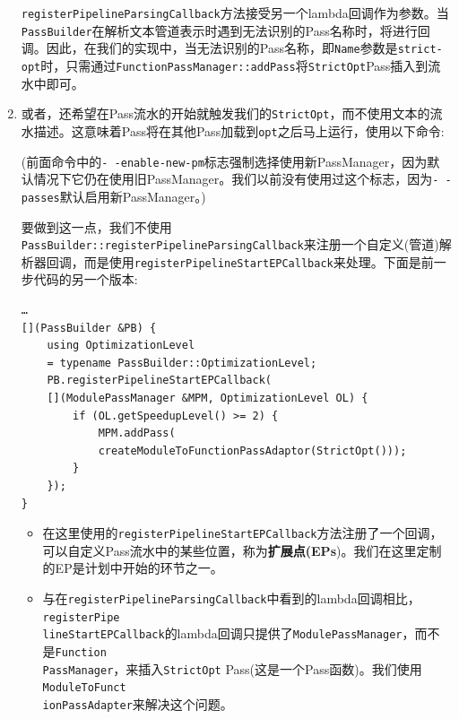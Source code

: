 \begin{enumerate}
\texttt{registerPipelineParsingCallback}方法接受另一个lambda回调作为参数。当\texttt{PassBuilder}在解析文本管道表示时遇到无法识别的Pass名称时，将进行回调。因此，在我们的实现中，当无法识别的Pass名称，即\texttt{Name}参数是\texttt{strict-opt}时，只需通过\texttt{FunctionPassManager::addPass}将\texttt{StrictOpt}Pass插入到流水中即可。

\item 或者，还希望在Pass流水的开始就触发我们的\texttt{StrictOpt}，而不使用文本的流水描述。这意味着Pass将在其他Pass加载到\texttt{opt}之后马上运行，使用以下命令:


(前面命令中的\texttt{-\,-enable-new-pm}标志强制选择使用新PassManager，因为默认情况下它仍在使用旧PassManager。我们以前没有使用过这个标志，因为\texttt{-\,-passes}默认启用新PassManager。)

要做到这一点，我们不使用\texttt{PassBuilder::registerPipelineParsingCallback}来注册一个自定义(管道)解析器回调，而是使用\texttt{registerPipelineStartEPCallback}来处理。下面是前一步代码的另一个版本:

\begin{lstlisting}[style=styleCXX]
…
[](PassBuilder &PB) {
	using OptimizationLevel
	= typename PassBuilder::OptimizationLevel;
	PB.registerPipelineStartEPCallback(
	[](ModulePassManager &MPM, OptimizationLevel OL) {
		if (OL.getSpeedupLevel() >= 2) {
			MPM.addPass(
			createModuleToFunctionPassAdaptor(StrictOpt()));
		}
	});
}
\end{lstlisting}

\begin{itemize}
\item 在这里使用的\texttt{registerPipelineStartEPCallback}方法注册了一个回调，可以自定义Pass流水中的某些位置，称为\textbf{扩展点(EPs})。我们在这里定制的EP是计划中开始的环节之一。

\item 与在\texttt{registerPipelineParsingCallback}中看到的lambda回调相比，\texttt{registerPipe\\lineStartEPCallback}的lambda回调只提供了\texttt{ModulePassManager}，而不是\texttt{Function\\PassManager}，来插入\texttt{StrictOpt} Pass(这是一个Pass函数)。我们使用\texttt{ModuleToFunct\\ionPassAdapter}来解决这个问题。


\end{itemize}
\end{enumerate}
